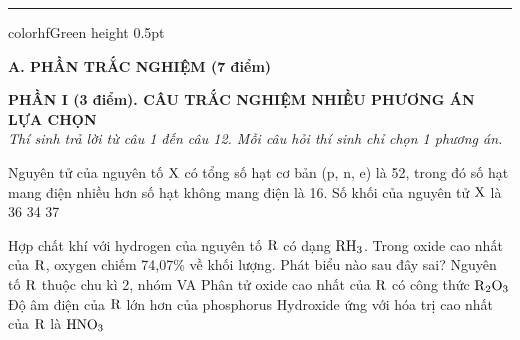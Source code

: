 \documentclass[11pt,a4paper]{article}
\begin{document}
\vspace{4pt}
\hrule color{hfGreen} height 0.5pt

\vspace{4pt}
\noindent
{\color{mainGreen}\textbf{\Large A. PHẦN TRẮC NGHIỆM (7 điểm)}}

\vspace{3pt}
\noindent
{\color{mainGreen}\textbf{\large PHẦN I (3 điểm). CÂU TRẮC NGHIỆM NHIỀU PHƯƠNG ÁN LỰA CHỌN}}\\
\textit{\small Thí sinh trả lời từ câu 1 đến câu 12. Mỗi câu hỏi thí sinh chỉ chọn 1 phương án.}
\vspace{2pt}

\begin{ex}
Nguyên tử của nguyên tố $\ce{X}$ có tổng số hạt cơ bản (p, n, e) là 52, trong đó số hạt mang điện nhiều hơn số hạt không mang điện là 16. Số khối của nguyên tử $\ce{X}$ là
\choice
{}
{36}
{34}
{37}

\end{ex}
\begin{ex}
Hợp chất khí với hydrogen của nguyên tố $\ce{R}$ có dạng $\ce{RH3}$. Trong oxide cao nhất của $\ce{R}$, oxygen chiếm 74,07\% về khối lượng. Phát biểu nào sau đây sai?
\choice
{Nguyên tố $\ce{R}$ thuộc chu kì 2, nhóm VA}
{\True Phân tử oxide cao nhất của $\ce{R}$ có công thức $\ce{R2O3}$}
{Độ âm điện của $\ce{R}$ lớn hơn của phosphorus}
{Hydroxide ứng với hóa trị cao nhất của $\ce{R}$ là $\ce{HNO3}$}

\end{ex}
\end{document}
